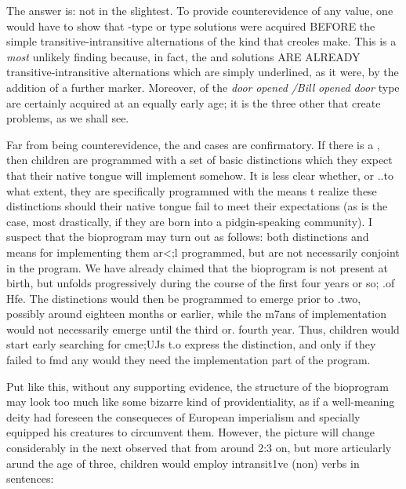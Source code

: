 The answer is: not in the slightest. To provide counterevidence of any value, one would have to show that -type or \-type solutions were acquired BEFORE the simple transitive-intransitive alternations of the kind that creoles make. This is a \textit{most} unlikely finding because, in fact, the  and  solutions ARE AL\-READY transitive-intransitive alternations which are simply under\-lined, as it were, by the addition of a further marker. Moreover,   of the \textit{door} \textit{opened} \textit{/Bill} \textit{opened} \textit{door} type are certainly acquired at an equally early age; it is the three other   that create problems, as we shall see.

Far from being counterevidence, the  and  cases are confirmatory. If there is a , then children are programmed with a set of basic distinctions which they expect that their native tongue will implement somehow. It is less clear whether, or ..to what extent, they are specifically programmed with the means t realize these distinctions should their native tongue fail to meet their expectations (as is the case, most drastically, if they are born into a pidgin-speaking community). I suspect that the bioprogram may turn out as follows: both distinctions and means for implementing them ar{\textless};l programmed, but are not necessarily conjoint in the program. We have already claimed that the bioprogram is not present at birth, but unfolds progressively during the course of the first four years or
so; .of Hfe. The distinctions would then be programmed to emerge
prior to .two, possibly around eighteen months or earlier, while the m7ans of implementation would not necessarily emerge until the
third or. fourth year. Thus, children would start early searching for cme;UJs t.o express the distinction, and only if they failed to fmd any
would they need the implementation part of the program.


Put like this, without any supporting evidence, the structure of the bioprogram may look too much like some bizarre kind of provi\-dentiality, as if a well-meaning deity had foreseen the consequeces of European imperialism and specially equipped his creatures to circum\-vent them. However, the picture will change considerably in the next
\citet{Bowerman1974} observed that from around 2:3 on, but more
articularly arund the age of three, children would employ intransi\-t1ve (non) verbs in  sentences:


